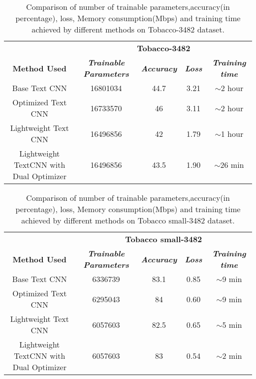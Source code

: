 \documentclass[conference]{IEEEtran}
\begin{document}
\begin{table*}[htbp]
\caption{Comparison of number of trainable parameters,accuracy(in percentage), loss, Memory consumption(Mbps) and training time achieved by different methods on Tobacco-3482 dataset.}
\begin{center}
\begin{tabular}{|c|c|c|c|c|}
\hline
\textbf{}&\multicolumn{4}{|c|}{\textbf{Tobacco-3482}} \\
\cline{2-5} 
\textbf{Method Used} & \textbf{\textit{Trainable Parameters}} & 
\textbf{\textit{Accuracy}} & \textbf{\textit{Loss}}&
\textbf{\textit{Training time}} \\
\hline
Base Text CNN & 16801034 &44.7 & 3.21 & $\sim$2 hour\\
\hline
Optimized Text CNN & 16733570 & 46 & 3.11 & $\sim$2 hour \\
\hline
Lightweight Text CNN & 16496856 & 42 & 1.79 & $\sim$1 hour\\
\hline
Lightweight TextCNN with Dual Optimizer & 16496856 & 43.5 & 1.90 & $\sim$26 min\\
\hline


\end{tabular}
\label{tab1}
\end{center}
\end{table*}

\begin{table*}[htbp]
\caption{Comparison of number of trainable parameters,accuracy(in percentage), loss, Memory consumption(Mbps) and training time achieved by different methods on Tobacco  small-3482 dataset.}
\begin{center}
\begin{tabular}{|c|c|c|c|c|}
\hline
\textbf{}&\multicolumn{4}{|c|}{\textbf{Tobacco small-3482}} \\
\cline{2-5} 
\textbf{Method Used} & \textbf{\textit{Trainable Parameters}} &

\textbf{\textit{Accuracy}} & \textbf{\textit{Loss}}&
\textbf{\textit{Training time}} \\
\hline
Base Text CNN & 6336739 & 83.1 & 0.85 & $\sim$9 min \\
\hline
Optimized Text CNN & 6295043 & 84& 0.60 & $\sim$9 min  \\
\hline
Lightweight Text CNN & 6057603 & 82.5 & 0.65 & $\sim$5 min\\
\hline
Lightweight TextCNN with Dual Optimizer & 6057603 & 83 & 0.54 & $\sim$2 min \\
\hline


\end{tabular}
\label{tab1}
\end{center}
\end{table*}
\end{document}
